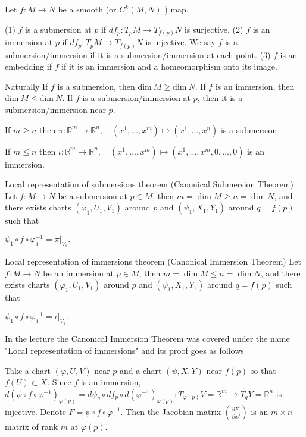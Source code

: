 Let \(f : M \to N\) be a smooth (or \( C^k(M, N) \) ) map.

(1) \(f\) is a submersion at \(p\) if \(df_p : T_p M \to T_{f(p)} N\) is surjective.
(2) \(f\) is an immersion at \(p\) if \(df_p : T_p M \to T_{f(p)} N\) is injective. 
We say \(f\) is a submersion/immersion if it is a submersion/immersion at each point.
(3) \(f\) is an embedding if \( f \) if it is an immersion and a homeomorphism onto its image.

Naturally
If \(f\) is a submersion, then \(\text{dim}\ M ≥ \text{dim}\ N\).
If \(f\) is an immersion, then \(\text{dim}\ M \leq \text{dim}\ N\).
If \(f\) is a submersion/immersion at \( p \), then it is a submersion/immersion near \( p \).

If \( m \geq n \) then
\(\pi: \mathbb{R}^m \to \mathbb{R}^n, \quad (x^1, \dots, x^m) \mapsto (x^1, \dots, x^n)\)
is a submersion

If \( m \leq n \) then
\( \iota: \mathbb{R}^m \to \mathbb{R}^n, \quad (x^1, \dots, x^m) \mapsto (x^1, \dots, x^m, 0, \dots, 0) \)
is an immersion.

Local representation of submersions theorem (Canonical Submersion Theorem)
Let \(f : M \to N\) be a submersion at \(p \in M\), then \(m = \dim M \geq n = \dim N\), and there exists charts \((\varphi_1, U_1, V_1)\) around \(p\) and \((\psi_1, X_1, Y_1)\) around \(q = f(p)\) such that

\(\psi_1 \circ f \circ \varphi_1^{-1} = \pi |_{V_1}.\)

Local representation of immersions theorem (Canonical Immersion Theorem)
Let \(f : M \to N\) be an immersion at \(p \in M\), then \(m = \dim M \leq n = \dim N\), and there exists charts \((\varphi_1, U_1, V_1)\) around \(p\) and \((\psi_1, X_1, Y_1)\) around \(q = f(p)\) such that

\(\psi_1 \circ f \circ \varphi_1^{-1} = \iota |_{V_1}.\)

In the lecture the Canonical Immersion Theorem was covered under the name "Local representation of immersions" and its proof goes as follows

Take a chart \((\varphi, U, V)\) near \(p\) and a chart \((\psi, X, Y)\) near \(f(p)\) so that \(f(U) \subset X\). Since \(f\) is an immersion,
\(d(\psi \circ f \circ \varphi^{-1})_{\varphi(p)} = d\psi_{q} \circ df_{p} \circ d(\varphi^{-1})_{\varphi(p)} : T_{\varphi(p)}V = \mathbb{R}^m \to T_{q}Y = \mathbb{R}^n\)
is injective. Denote \(F = \psi \circ f \circ \varphi^{-1}\). Then the Jacobian matrix \((\frac{\partial F^i}{\partial x^j})\) is an \(m \times n\) matrix of rank \(m\) at \(\varphi(p)\). 


